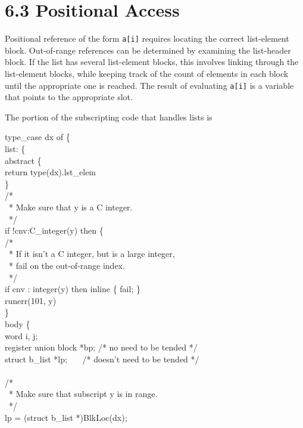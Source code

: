 \section[6.3 Positional Access]{6.3 Positional Access}

Positional reference of the form \texttt{a[i]} requires locating the
correct list-element block. Out-of-range references can be determined
by examining the list-header block. If the list has several
list-element blocks, this involves linking through the list-element
blocks, while keeping track of the count of elements in each block
until the appropriate one is reached. The result of evaluating
\texttt{a[i]} is a variable that points to the appropriate slot.

The portion of the subscripting code that handles lists is

\begin{iconcode}
\>type\_case dx of \{\\
\>\>list: \{\\
\>\>\>abstract \{\\
\>\>\>\>return type(dx).lst\_elem\\
\>\>\>\>\}\\
\>\>\>/*\\
\>\>\>\ * Make sure that y is a C integer.\\
\>\>\>\ */\\
\>\>\>if !cnv:C\_integer(y) then \{\\
\>\>/*\\
\>\>\ * If it isn't a C integer, but is a large integer,\\
\>\>\ * fail on the out-of-range index.\\
\>\>\ */\\
\>\>if cnv : integer(y) then inline \{ fail; \}\\
\>\>runerr(101, y)\\
\>\>\}\\
\>\>\>body \{\\
\>\>\>\>word i, j;\\
\>\>\>\>register union block *bp; /* no need to be tended */\\
\>\>\>\>struct b\_list *lp; \ \ \ /* doesn't need to be tended */\\
\\
\>\>/*\\
\>\>\ * Make sure that subscript y is in range.\\
\>\>\ */\\
\>\>\>\>lp = (struct b\_list *)BlkLoc(dx);\\

\end{iconcode}
